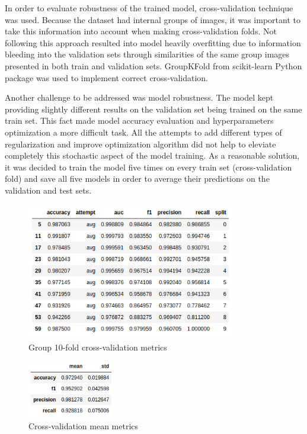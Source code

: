 \documentclass[a4paper]{article}
\begin{document}
In order to evaluate robustness of the trained model, cross-validation technique was used. Because the dataset
had internal groups of images, it was important to take this information into account when making cross-validation
folds. Not following this approach resulted into model heavily overfitting due to information bleeding into the
validation sets through similarities of the same group images presented in both train and validation sets.
GroupKFold from scikit-learn Python package was used to implement correct cross-validation.

Another challenge to be addressed was model robustness. The model kept providing slightly different results
on the validation set being trained on the same train set. This fact made model accuracy evaluation and 
hyperparameters optimization a more difficult task. All the attempts to add different types of regularization and 
improve optimization algorithm did not help to eleviate completely this stochastic aspect of the model training.
As a reasonable solution, it was decided to train the model five times on every train set (cross-validation fold)
and save all five models in order to average their predictions on the validation and test sets.

\begin{figure}[H]
    \centering
        \includegraphics[width=\textwidth,height=6cm,keepaspectratio]{cross-validation_metrics.png}
    \caption{Group 10-fold cross-validation metrics}
\end{figure}

\begin{figure}[H]
    \centering
        \includegraphics[width=\textwidth,height=2.5cm,keepaspectratio]{cross-validation_mean_metrics.png}
    \caption{Cross-validation mean metrics}
\end{figure}
\end{document}
